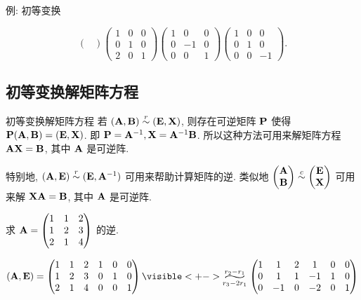 \begin{frame}{例: 初等变换}
\begin{solution}
{\[\begin{pmatrix}
		\end{pmatrix}\begin{pmatrix}
			1&0&0\\0&1&0\\2&0&1
		\end{pmatrix}\begin{pmatrix}
			1&0&0\\0&-1&0\\0&0&1
		\end{pmatrix}\begin{pmatrix}
			1&0&0\\0&1&0\\0&0&-1
		\end{pmatrix}.\]}
		\vspace{-.3\baselineskip}
	\end{solution}
	\endgroup
\end{frame}




\subsection{初等变换解矩阵方程}
\begin{frame}{初等变换解矩阵方程}
	\onslide<+->
	若 $({\mathbf{A}},{\mathbf{B}})\mathrel{\overset{r}{\sim}} ({\mathbf{E}},{\mathbf{X}})$, 则存在可逆矩阵 ${\mathbf{P}}$ 使得 ${\mathbf{P}}({\mathbf{A}},{\mathbf{B}})=({\mathbf{E}},{\mathbf{X}})$.
	\onslide<+->
	即 ${\mathbf{P}}={\mathbf{A}}^{-1},{\mathbf{X}}={\mathbf{A}}^{-1}{\mathbf{B}}$.
	\onslide<+->
	所以这种方法可用来解矩阵方程 ${\mathbf{A}}{\mathbf{X}}={\mathbf{B}}$, 其中 ${\mathbf{A}}$ 是可逆阵.

	\onslide<+->
	特别地, \alert{$({\mathbf{A}},{\mathbf{E}})\mathrel{\overset{r}{\sim}}({\mathbf{E}},{\mathbf{A}}^{-1})$} 可用来帮助计算矩阵的逆.
	\onslide<+->
	类似地 $\begin{pmatrix}
		{\mathbf{A}}\\
		{\mathbf{B}}
	\end{pmatrix}\mathrel{\overset{c}{\sim}}\begin{pmatrix}
		{\mathbf{E}}\\
		{\mathbf{X}}
	\end{pmatrix}$ 可用来解 ${\mathbf{X}}{\mathbf{A}}={\mathbf{B}}$, 其中 ${\mathbf{A}}$ 是可逆阵.

	\onslide<+->
	\begin{exercise}
		求 ${\mathbf{A}}=\begin{pmatrix}
			1&1&2\\1&2&3\\2&1&4
		\end{pmatrix}$ 的逆.
	\end{exercise}
	\onslide<+->
	\begin{solution}
		\[(\bfA,\bfE)=\begin{pmatrix}
			1&1&2&1&0&0\\
			1&2&3&0&1&0\\
			2&1&4&0&0&1
		\end{pmatrix}
		\visible<+->{\wsim[3]{r_2-r_1}{r_3-2r_1}\begin{pmatrix}
			1&1&2&1&0&0\\
			0&1&1&-1&1&0\\
			0&-1&0&-2&0&1
		\end{pmatrix}}\]
		\vspace{-.7\baselineskip}
	\end{solution}
\end{frame}


